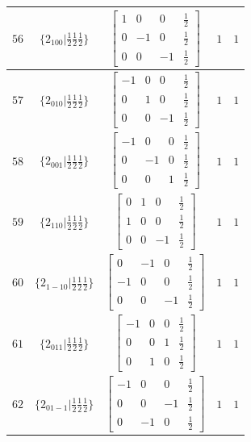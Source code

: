 \documentclass[fleqn,8pt]{jsarticle}
\begin{document}
\begin{longtable}{ccccc}
$ 56 $ & $ \{2{}_{100}|\frac{1}{2} \frac{1}{2} \frac{1}{2}\} $ & $ \begin{bmatrix} 1 & 0 & 0 & \frac{1}{2} \\ 0 & -1 & 0 & \frac{1}{2} \\ 0 & 0 & -1 & \frac{1}{2} \end{bmatrix} $ & $ 1 $ & $ 1 $ \\ \hline
$ 57 $ & $ \{2{}_{010}|\frac{1}{2} \frac{1}{2} \frac{1}{2}\} $ & $ \begin{bmatrix} -1 & 0 & 0 & \frac{1}{2} \\ 0 & 1 & 0 & \frac{1}{2} \\ 0 & 0 & -1 & \frac{1}{2} \end{bmatrix} $ & $ 1 $ & $ 1 $ \\ \hline
$ 58 $ & $ \{2{}_{001}|\frac{1}{2} \frac{1}{2} \frac{1}{2}\} $ & $ \begin{bmatrix} -1 & 0 & 0 & \frac{1}{2} \\ 0 & -1 & 0 & \frac{1}{2} \\ 0 & 0 & 1 & \frac{1}{2} \end{bmatrix} $ & $ 1 $ & $ 1 $ \\ \hline
$ 59 $ & $ \{2{}_{110}|\frac{1}{2} \frac{1}{2} \frac{1}{2}\} $ & $ \begin{bmatrix} 0 & 1 & 0 & \frac{1}{2} \\ 1 & 0 & 0 & \frac{1}{2} \\ 0 & 0 & -1 & \frac{1}{2} \end{bmatrix} $ & $ 1 $ & $ 1 $ \\ \hline
$ 60 $ & $ \{2{}_{1-10}|\frac{1}{2} \frac{1}{2} \frac{1}{2}\} $ & $ \begin{bmatrix} 0 & -1 & 0 & \frac{1}{2} \\ -1 & 0 & 0 & \frac{1}{2} \\ 0 & 0 & -1 & \frac{1}{2} \end{bmatrix} $ & $ 1 $ & $ 1 $ \\ \hline
$ 61 $ & $ \{2{}_{011}|\frac{1}{2} \frac{1}{2} \frac{1}{2}\} $ & $ \begin{bmatrix} -1 & 0 & 0 & \frac{1}{2} \\ 0 & 0 & 1 & \frac{1}{2} \\ 0 & 1 & 0 & \frac{1}{2} \end{bmatrix} $ & $ 1 $ & $ 1 $ \\ \hline
$ 62 $ & $ \{2{}_{01-1}|\frac{1}{2} \frac{1}{2} \frac{1}{2}\} $ & $ \begin{bmatrix} -1 & 0 & 0 & \frac{1}{2} \\ 0 & 0 & -1 & \frac{1}{2} \\ 0 & -1 & 0 & \frac{1}{2} \end{bmatrix} $ & $ 1 $ & $ 1 $ \\ \hline

\end{longtable}
\end{document}
